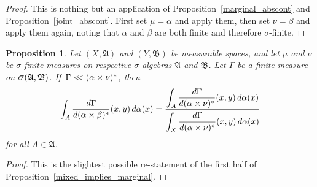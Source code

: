 \documentclass[
twoside=true,
paper=letter,
fontsize=9pt,
pagesize=auto,
leqno,
openany,
headsepline,
overfullrule,
]{scrbook}
\theoremstyle{plain}
\theoremstyle{plain}
\newtheorem{prop}[thm]{Proposition}
\theoremstyle{definition}
\theoremstyle{bfnoteitalic}
\theoremstyle{bfnoteroman}
\newcommand{\sigalg}[1]{\mathfrak{#1}}
\newcommand{\sagb}{\mathop{\hbox{\large{$\sigma$}}}\nolimits}
\newcommand{\textsigma}{\hbox{\large{$\sigma$}}\kern-1pt}
\newcommand{\sigmaalgebra}{\sigalg{A}}
\newcommand{\sigmaalgebraii}{\sigalg{B}}
\newcommand{\productsig}[2]{\sagb(#1,#2)}
\newcommand{\lilstrut}{\vphantom{\bigl(}}
\newcommand{\measurespace}{X}
\newcommand{\measurespaceii}{Y}
\newcommand{\mspaceelt}{x}
\newcommand{\mspaceeltii}{y}
\newcommand{\abscont}{\mathrel{< \kern-3.5pt <}}
\newcommand{\measure}{\mu}
\newcommand{\measmu}{\mu}
\newcommand{\measureii}{\nu}
\newcommand{\measnu}{\nu}
\newcommand{\seti}{A}
\newcommand{\measonprod}{\Gamma}%
\newcommand{\marginalone}{\alpha}%
\newcommand{\marginaltwo}{\beta}%
\begin{document}
\begin{proof}
This is nothing but an application of Proposition~\ref{marginal_abscont} and Proposition~\ref{joint_abscont}. First set $\measmu=\marginalone$ and apply them, then set $\measnu=\marginaltwo$ and apply them again, noting that $\marginalone$ and $\marginaltwo$ are both finite and therefore \textsigma\hyp{}finite.
\end{proof}


\begin{prop}\label{mixed_implies_half}
Let
$(\measurespace, \sigmaalgebra)$
and
$(\measurespaceii, \sigmaalgebraii)$
be measurable spaces, and let $\measure$ and $\measureii$
be \textsigma-finite measures on  respective \textsigma-algebras
$\sigmaalgebra$ and $\sigmaalgebraii$.
Let $\measonprod$ be a finite measure on
$\productsig{\sigmaalgebra}{\sigmaalgebraii}$.
If\,
$\measonprod \abscont (\marginalone\times\measnu)^*$, then
\[
\int_\seti
\frac{d\measonprod}{d(\marginalone\times\marginaltwo)^*}
(\mspaceelt,\mspaceeltii)\,d\marginalone(\mspaceelt)
=
\frac{\displaystyle
\int_\seti
\dfrac{d\measonprod}{d(\marginalone\times\measnu)^*}(\mspaceelt,\mspaceeltii)
\,d\marginalone(\mspaceelt)
}
{\displaystyle
\int_\measurespace
\dfrac{d\measonprod\lilstrut}{d(\marginalone\times\measnu)^*}(\mspaceelt,\mspaceeltii)
\,d\marginalone(\mspaceelt)
}
\]
for all $\seti\in\sigmaalgebra$.
\end{prop}


\begin{proof}
This is the slightest possible re-statement of the first half of Proposition~\ref{mixed_implies_marginal}.
\end{proof}
\end{document}
